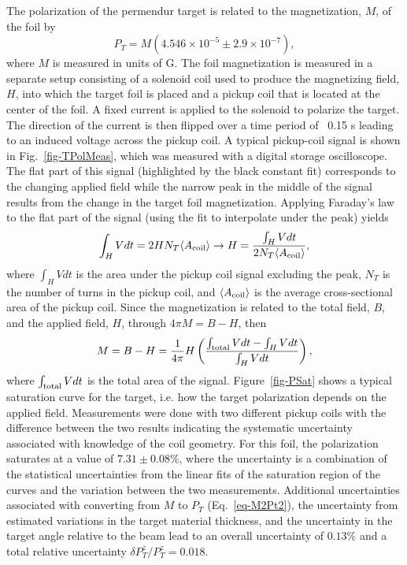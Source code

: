 The polarization of the permendur target is related to the magnetization, $M$, of the foil by \cite{Band:1997ee} 
%
\begin{equation}
\label{eq-M2Pt2}
	P_T=M\left(4.546\times 10^{-5}\pm 2.9\times 10^{-7}\right),
\end{equation}
%
where $M$ is measured in units of G. The foil magnetization is measured in a separate setup consisting of a solenoid coil used to produce 
the magnetizing field, $H$, into which the target foil is placed and a pickup coil that is located at the center of the foil. A fixed current is 
applied to the solenoid to polarize the target. The direction of the current is then flipped over a time period of ~0.15 s leading to an 
induced voltage across the pickup coil. A typical pickup-coil signal is shown in Fig.~\ref{fig-TPolMeas}, which was measured with a 
digital storage oscilloscope. The flat part of this signal (highlighted by the black constant fit) corresponds to the changing applied field while 
the narrow peak in the middle of the signal results from the change in the target foil magnetization. Applying Faraday's law to the flat part of 
the signal (using the fit to interpolate under the peak) yields
%
\begin{equation}
\label{eq-H}
	\int_H  Vdt=2HN_T \langle A_{\rm coil}\rangle\rightarrow H=\frac{\int_H Vdt}{2N_T\langle A_{\rm coil}\rangle} ,
\end{equation}
%
where $\int_H Vdt$ is the area under the pickup coil signal excluding the peak, $N_T$ is the number of turns in the pickup coil, and 
$\langle A_{\rm coil}\rangle$ is the average cross-sectional area of the pickup coil.
Since the magnetization is related to the total field, $B$, and the applied field, $H$, through $4\pi M=B-H$, then
%
\begin{equation}
\label{eq-M}
	M=B-H=\frac{1}{4\pi}H\left(\frac{\int_{\rm total} Vdt-\int_HVdt}{\int_HVdt}\right),
\end{equation}
%
where $\int_{\rm total} Vdt$ is the total area of the signal. Figure~\ref{fig-PSat} shows a typical saturation curve for the target, i.e. how 
the target polarization depends on the applied field. Measurements were done with two different pickup coils with the difference between 
the two results indicating the systematic uncertainty associated with knowledge of the coil geometry. For this foil, the polarization saturates 
at a value of $7.31\pm 0.08$\%, where the uncertainty is a combination of the statistical uncertainties from the linear fits of the saturation
region of the curves and the variation between the two measurements. Additional uncertainties associated with converting from $M$ to $P_T$ 
(Eq.~\ref{eq-M2Pt2}), the uncertainty from estimated variations in the target material thickness, and the uncertainty in the target angle relative
to the beam lead to an overall uncertainty of $0.13\%$ and a total relative uncertainty $\delta P_T^z/P_T^z=0.018$.



